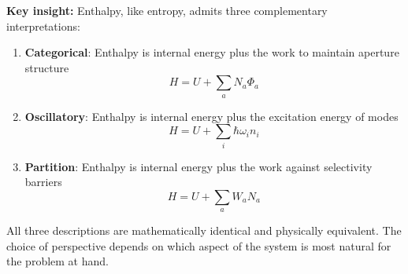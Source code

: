 \textbf{Key insight:} Enthalpy, like entropy, admits three complementary interpretations:
\begin{enumerate}
\item \textbf{Categorical}: Enthalpy is internal energy plus the work to maintain aperture structure
\begin{equation}
H = U + \sum_a N_a \Phi_a
\end{equation}

\item \textbf{Oscillatory}: Enthalpy is internal energy plus the excitation energy of modes
\begin{equation}
H = U + \sum_i \hbar\omega_i n_i
\end{equation}

\item \textbf{Partition}: Enthalpy is internal energy plus the work against selectivity barriers
\begin{equation}
H = U + \sum_a W_a N_a
\end{equation}
\end{enumerate}

All three descriptions are mathematically identical and physically equivalent. The choice of perspective depends on which aspect of the system is most natural for the problem at hand.
